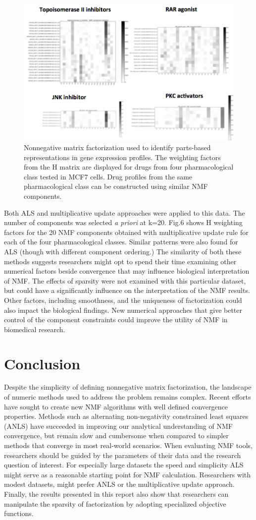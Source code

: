 \documentclass[final,leqno,onefignum,onetabnum]{siamltex1213}
\begin{document}
\begin{figure}[t!]
  \centering
    \includegraphics[width=.5\linewidth]{NMF_pharmacological_classification}
  \caption{Nonnegative matrix factorization used to identify parts-based representations in gene expression profiles. The weighting factors from the H matrix are displayed for drugs from four pharmacological class tested in MCF7 cells. Drug profiles from the same pharmacological class can be constructed using similar NMF components.}
\end{figure}

Both ALS and multiplicative update approaches were applied to this data. The number of components was selected \textit{a priori} at k=20. Fig.6 shows H weighting factors for the 20 NMF components obtained with multiplicative update rule for each of the four pharmacological classes. Similar patterns were also found for ALS (though with different component ordering.) The similarity of both these methods suggests researchers might opt to spend their time examining other numerical factors beside convergence that may influence biological interpretation of NMF. The effects of sparsity were not examined with this particular dataset, but could have a significantly influence on the interpretation of the NMF results. Other factors, including smoothness, and the uniqueness of factorization could also impact the biological findings. New numerical approaches that give better control of the component constraints could improve the utility of NMF in biomedical research. 

\section{Conclusion} Despite the simplicity of defining nonnegative matrix factorization, the landscape of numeric methods used to address the problem remains complex. Recent efforts have sought to create new NMF algorithms with well defined convergence properties. Methods such as alternating non-negativity constrained least squares (ANLS) have succeeded in improving our analytical understanding of NMF convergence, but remain slow and cumbersome when compared to simpler methods that converge in most real-world scenarios. When evaluating NMF tools, researchers should be guided by the parameters of their data and the research question of interest. For especially large datasets the speed and simplicity ALS might serve as a reasonable starting point for NMF calculation. Researchers with modest datasets, might prefer ANLS or the multiplicative update approach. Finally, the results presented in this report also show that researchers can manipulate the sparsity of factorization by adopting specialized objective functions. 
\end{document}
